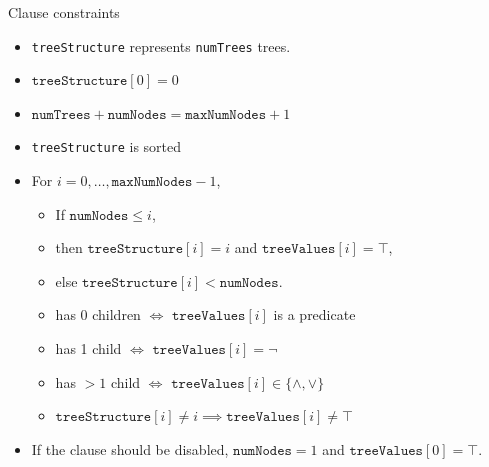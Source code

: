 \documentclass{beamer}
\begin{document}

\begin{frame}{Clause constraints}
  \begin{itemize}
  \item \texttt{treeStructure} represents \texttt{numTrees} trees.
  \item $\texttt{treeStructure}[0] = 0$
  \item $\texttt{numTrees} + \texttt{numNodes} = \texttt{maxNumNodes} + 1$
  \item \texttt{treeStructure} is sorted
  \item For $i = 0, \dots, \texttt{maxNumNodes} - 1$,
    \begin{itemize}
    \item If $\texttt{numNodes} \le i$,
    \item then $\texttt{treeStructure}[i] = i$ and $\texttt{treeValues}[i] = \top$,
    \item else $\texttt{treeStructure}[i] < \texttt{numNodes}$.
    \item has 0 children $\iff$ $\texttt{treeValues}[i]$ is a predicate
    \item has 1 child $\iff$ $\texttt{treeValues}[i] = \neg$
    \item has $>1$ child $\iff$ $\texttt{treeValues}[i] \in \{ \land, \lor \}$
    \item $\texttt{treeStructure}[i] \ne i \implies \texttt{treeValues}[i] \ne \top$
    \end{itemize}
  \item If the clause should be disabled, $\texttt{numNodes} = 1$ and
    $\texttt{treeValues}[0] = \top$.
  \end{itemize}
\end{frame}
\end{document}
